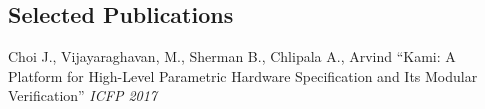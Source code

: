 \documentclass[margin]{resume}
\begin{document}
\begin{resume}
    \vspace{-5mm}


    \section{\mysidestyle Selected Publications}
    Choi J., {Vijayaraghavan, M.}, Sherman B., Chlipala A., Arvind ``Kami: A Platform for High-Level Parametric Hardware Specification and Its Modular Verification'' \textit{ICFP 2017}


\end{resume}
\end{document}
